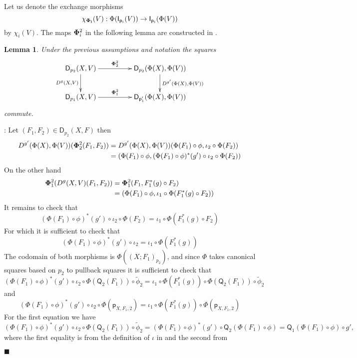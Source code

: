 \documentclass[12pt]{article}
\numberwithin{equation}{section}
\newenvironment{myproof}{{\bf Proof}:}{$\blacksquare$ \vskip 5mm }
\newtheorem{lemma}[proposition]{Lemma}
\newcommand{\sr}{\rightarrow}
\newcommand{\wt}{\widetilde}
\newcommand{\p}{\mathsf{p}}
\newcommand{\D}{\mathsf{D}}
\newcommand{\I}{\mathsf{I}}
\newcommand{\Q}{\mathsf{Q}}
\begin{document}
%
Let us denote the exchange morphisms
%
$$\chi_{\bf\Phi_i}(V):\Phi(\I_{\p_i}(V))\sr \I_{\p_i}(\Phi(V))$$
%
by $\chi_i(V)$. The maps ${\bf\Phi}_i^2$ in the following lemma are constructed
in \cite[Construction 5.2]{fromunivwithPi}.
%
\begin{lemma}
\label{2015.04.08.l1} Under the previous assumptions and notation the squares
%
$$
\begin{xy}
          \xymatrix@C=4pc{ \D_{p_2}(X,V) \ar[r]^-{{\bf\Phi}_2^2}
            \ar[d]_{D^g(X,V)} & \D_{p_2}(\Phi(X),\Phi(V))
            \ar[d]^{D^{g'}(\Phi(X),\Phi(V))}\\ \D_{p_1}(X,V)
            \ar[r]^-{{\bf\Phi}_1^2} & \D_{\p_1'}(\Phi(X),\Phi(V)) }
\end{xy}
$$
%
commute.
\end{lemma}
%
\begin{myproof}
Let $(F_1,F_2)\in \D_{p_2}(X,F)$ then
%
\begin{align*}
  D^{g'}(\Phi(X),\Phi(V))({\bf\Phi}_2^2(F_1,F_2))
    & = D^{g'}(\Phi(X),\Phi(V))(\Phi(F_1)\circ \phi, \iota_2\circ \Phi(F_2)) \\
    & = (\Phi(F_1)\circ \phi, (\Phi(F_1)\circ \phi)^*(g')\circ \iota_2\circ \Phi(F_2))
\end{align*}
%
On the other hand
%
\begin{align*}
  {\bf\Phi}_1^2(D^g(X,V)(F_1,F_2)) 
    & = {\bf\Phi}_1^2(F_1,F_1^*(g)\circ F_2) \\
    & = (\Phi(F_1)\circ\phi,\iota_1\circ \Phi(F_1^*(g)\circ F_2))
\end{align*}
%
It remains to check that
%
$$(\Phi(F_1)\circ \phi)^*(g')\circ \iota_2\circ \Phi(F_2)=\iota_1\circ
\Phi(F_1^*(g)\circ F_2)$$
%
For which it is sufficient to check that
%
$$(\Phi(F_1)\circ \phi)^*(g')\circ \iota_2=\iota_1\circ \Phi(F_1^*(g))$$
%
The codomain of both morphisms is $\Phi((X;F_1)_{p_2})$, and since $\Phi$ takes
canonical squares based on $p_2$ to pullback squares it is sufficient to check
that
%
$$(\Phi(F_1)\circ \phi)^*(g')\circ \iota_2\circ
\Phi(\Q_2(F_1))\circ\wt{\phi}_2=\iota_1\circ \Phi(F_1^*(g))\circ
\Phi(\Q_2(F_1))\circ\wt{\phi}_2$$
%
and
%
$$(\Phi(F_1)\circ \phi)^*(g')\circ \iota_2\circ \Phi(\p_{X,F_1,2})=\iota_1\circ
\Phi(F_1^*(g))\circ \Phi(\p_{X,F_1,2})$$
%
For the first equation we have
%
$$(\Phi(F_1)\circ \phi)^*(g')\circ \iota_2\circ
\Phi(\Q_2(F_1))\circ\wt{\phi}_2=(\Phi(F_1)\circ \phi)^*(g')\circ
\Q_2(\Phi(F_1)\circ \phi)=\Q_1(\Phi(F_1)\circ\phi)\circ g',$$
%
where the first equality is from the definition of $\iota$ in
\cite[Construction 5.2]{fromunivwithPi} and the second from

\end{myproof}
\end{document}
